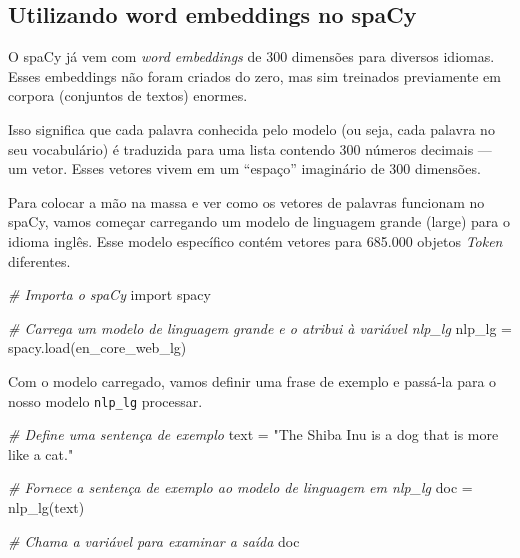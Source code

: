 \documentclass[
  brazilian,
]{article}
\newenvironment{Shaded}{}{}
\newcommand{\CommentTok}[1]{\textcolor[rgb]{0.38,0.63,0.69}{\textit{#1}}}
\newcommand{\ImportTok}[1]{#1}
\newcommand{\NormalTok}[1]{#1}
\newcommand{\OperatorTok}[1]{\textcolor[rgb]{0.40,0.40,0.40}{#1}}
\newcommand{\StringTok}[1]{\textcolor[rgb]{0.25,0.44,0.63}{#1}}
\begin{document}
\hypertarget{utilizando-word-embeddings-no-spacy}{%
\subsection{Utilizando word embeddings no
spaCy}\label{utilizando-word-embeddings-no-spacy}}

O spaCy já vem com \emph{word embeddings} de 300 dimensões para diversos
idiomas. Esses embeddings não foram criados do zero, mas sim treinados
previamente em corpora (conjuntos de textos) enormes.

Isso significa que cada palavra conhecida pelo modelo (ou seja, cada
palavra no seu vocabulário) é traduzida para uma lista contendo 300
números decimais --- um vetor. Esses vetores vivem em um ``espaço''
imaginário de 300 dimensões.

Para colocar a mão na massa e ver como os vetores de palavras funcionam
no spaCy, vamos começar carregando um modelo de linguagem grande (large)
para o idioma inglês. Esse modelo específico contém vetores para 685.000
objetos \emph{Token} diferentes.

\begin{Shaded}
\begin{Highlighting}[]
\CommentTok{\# Importa o spaCy}
\ImportTok{import}\NormalTok{ spacy}

\CommentTok{\# Carrega um modelo de linguagem grande e o atribui à variável \textquotesingle{}nlp\_lg\textquotesingle{}}
\NormalTok{nlp\_lg }\OperatorTok{=}\NormalTok{ spacy.load(}\StringTok{\textquotesingle{}en\_core\_web\_lg\textquotesingle{}}\NormalTok{)}
\end{Highlighting}
\end{Shaded}

Com o modelo carregado, vamos definir uma frase de exemplo e passá-la
para o nosso modelo \texttt{nlp\_lg} processar.

\begin{Shaded}
\begin{Highlighting}[]
\CommentTok{\# Define uma sentença de exemplo}
\NormalTok{text }\OperatorTok{=} \StringTok{"The Shiba Inu is a dog that is more like a cat."}

\CommentTok{\# Fornece a sentença de exemplo ao modelo de linguagem em \textquotesingle{}nlp\_lg\textquotesingle{}}
\NormalTok{doc }\OperatorTok{=}\NormalTok{ nlp\_lg(text)}

\CommentTok{\# Chama a variável para examinar a saída}
\NormalTok{doc}
\end{Highlighting}
\end{Shaded}
\end{document}
